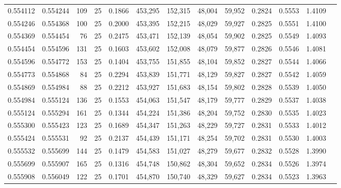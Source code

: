\begin{tabular}{rrrrrrrrrrrrr}
0.554112 & 0.554244 &   109 &  25 &                                     0.1866 & 453,295 & 152,315 &  48,004 &  59,952 & 0.2824 & 0.5553 & 1.4109 \\
0.554246 & 0.554368 &   100 &  25 &                                     0.2000 & 453,395 & 152,215 &  48,029 &  59,927 & 0.2825 & 0.5551 & 1.4100 \\
0.554369 & 0.554454 &    76 &  25 &                                     0.2475 & 453,471 & 152,139 &  48,054 &  59,902 & 0.2825 & 0.5549 & 1.4093 \\
0.554454 & 0.554596 &   131 &  25 &                                     0.1603 & 453,602 & 152,008 &  48,079 &  59,877 & 0.2826 & 0.5546 & 1.4081 \\
0.554596 & 0.554772 &   153 &  25 &                                     0.1404 & 453,755 & 151,855 &  48,104 &  59,852 & 0.2827 & 0.5544 & 1.4066 \\
0.554773 & 0.554868 &    84 &  25 &                                     0.2294 & 453,839 & 151,771 &  48,129 &  59,827 & 0.2827 & 0.5542 & 1.4059 \\
0.554869 & 0.554984 &    88 &  25 &                                     0.2212 & 453,927 & 151,683 &  48,154 &  59,802 & 0.2828 & 0.5539 & 1.4050 \\
0.554984 & 0.555124 &   136 &  25 &                                     0.1553 & 454,063 & 151,547 &  48,179 &  59,777 & 0.2829 & 0.5537 & 1.4038 \\
0.555124 & 0.555294 &   161 &  25 &                                     0.1344 & 454,224 & 151,386 &  48,204 &  59,752 & 0.2830 & 0.5535 & 1.4023 \\
0.555300 & 0.555423 &   123 &  25 &                                     0.1689 & 454,347 & 151,263 &  48,229 &  59,727 & 0.2831 & 0.5533 & 1.4012 \\
0.555424 & 0.555531 &    92 &  25 &                                     0.2137 & 454,439 & 151,171 &  48,254 &  59,702 & 0.2831 & 0.5530 & 1.4003 \\
0.555532 & 0.555699 &   144 &  25 &                                     0.1479 & 454,583 & 151,027 &  48,279 &  59,677 & 0.2832 & 0.5528 & 1.3990 \\
0.555699 & 0.555907 &   165 &  25 &                                     0.1316 & 454,748 & 150,862 &  48,304 &  59,652 & 0.2834 & 0.5526 & 1.3974 \\
0.555908 & 0.556049 &   122 &  25 &                                     0.1701 & 454,870 & 150,740 &  48,329 &  59,627 & 0.2834 & 0.5523 & 1.3963 \\

\end{tabular}

